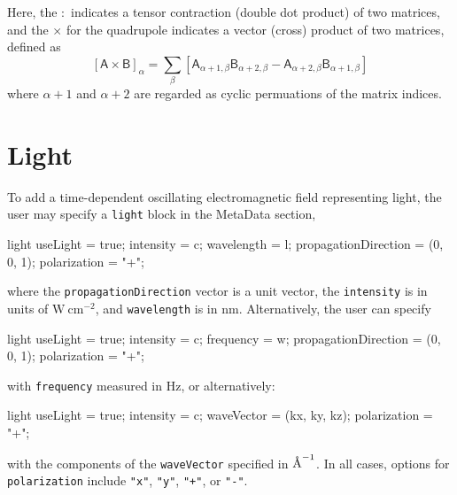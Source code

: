\documentclass[letterpaper]{report}
\newcommand{\angstrom}{\mbox{\normalfont\AA}}
\begin{document}
Here, the $:$ indicates a tensor contraction (double dot product) of
two matrices, and the $\times$ for the quadrupole indicates a vector
(cross) product of two matrices, defined as
\begin{equation}
\left[\mathsf{A} \times \mathsf{B}\right]_\alpha = \sum_\beta
\left[\mathsf{A}_{\alpha+1,\beta} \mathsf{B}_{\alpha+2,\beta}
  -\mathsf{A}_{\alpha+2,\beta} \mathsf{B}_{\alpha+1,\beta} 
\right]
\label{eq:matrixCross}
\end{equation}
where $\alpha+1$ and $\alpha+2$ are regarded as cyclic
permuations of the matrix indices.

\section{\label{sec:Light}Light} 
To add a time-dependent oscillating electromagnetic field representing
light, the user may specify a \texttt{light} block in the MetaData
section,

\begin{code}[caption={Specifying a light field using intensity,
wavelength, and propagation direction.},label={sch:light1}]
    light{
      useLight = true;
      intensity = c;
      wavelength = l;
      propagationDirection = (0, 0, 1);
      polarization = "+";
    }
\end{code}

\noindent where the \texttt{propagationDirection} vector is a unit
vector, the \texttt{intensity} is in units of $\mathrm{W~cm^{-2}}$,
and \texttt{wavelength} is in nm. Alternatively, the user
can specify

\begin{code}[caption={Specifying a light field using intensity,
frequency, and propagation direction.},label={sch:light2}]
    light{
      useLight = true;
      intensity = c;
      frequency = w;
      propagationDirection = (0, 0, 1);
      polarization = "+";
    }
\end{code}

\noindent with \texttt{frequency} measured in Hz, or alternatively:

\begin{code}[caption={Specifying a light field using intensity
and wave vector.},label={sch:light3}]
    light{
      useLight = true;
      intensity = c;
      waveVector = (kx, ky, kz);
      polarization = "+";
    }
\end{code}

\noindent with the components of the \texttt{waveVector} specified in $\angstrom^{-1}$.
In all cases, options for \texttt{polarization} include \texttt{"x"},
\texttt{"y"}, \texttt{"+"}, or \texttt{"-"}.  
\end{document}
